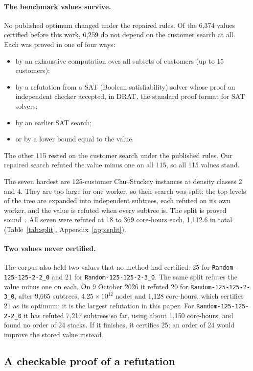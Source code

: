 \paragraph{The benchmark values survive.} No published optimum changed under
the repaired rules. Of the 6,374 values certified before this work, 6,259 do
not depend on the customer search at all. Each was proved in one of four ways:
\begin{itemize}
\item by an exhaustive computation over all subsets of customers (up to 15
  customers);
\item by a refutation from a SAT (Boolean satisfiability) solver whose proof an
  independent checker accepted, in DRAT, the standard proof format for SAT
  solvers;
\item by an earlier SAT search;
\item or by a lower bound equal to the value.
\end{itemize}
The other 115 rested on the customer search
under the published rules. Our repaired search refuted the value minus one on
all 115, so all 115 values stand.

The seven hardest are 125-customer Chu--Stuckey instances at density classes 2
and 4. They are too large for one worker, so their search was split:
the top levels of the tree are expanded into independent subtrees, each
refuted on its own worker, and the value is refuted when every subtree is. The
split is proved sound~. All seven were refuted at 18 to 369
core-hours each, 1,112.6 in total (Table~\ref{tab:split},
Appendix~\ref{app:split}).

\paragraph{Two values never certified.} The corpus also held two values that
no method had certified: 25 for \texttt{Random-125-125-2-2\_0} and 21 for
\texttt{Random-125-125-2-3\_0}. The same split refutes the value minus one on
each. On 9 October 2026 it refuted 20 for \texttt{Random-125-125-2-3\_0}, after
9,665 subtrees, $4.25\times10^{12}$ nodes and 1,128 core-hours, which
certifies 21 as its optimum; it is the largest refutation in this paper. For
\texttt{Random-125-125-2-2\_0} it has refuted 7,217 subtrees so far, using
about 1,150 core-hours, and found no order of 24 stacks. If it finishes, it
certifies 25; an order of 24 would improve the stored value instead.

\subsection{A checkable proof of a refutation}
\label{sec:certs}

